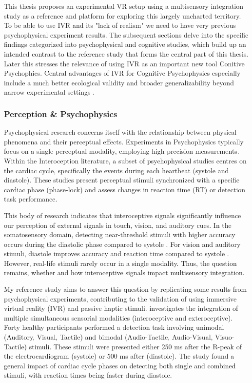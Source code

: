 \documentclass[12pt,oneside,openright]{report}
\begin{document}
This thesis proposes an experimental VR setup using a multisensory integration study as a reference and platform for exploring this largely uncharted territory. To be able to use IVR and its "lack of realism" we need to have very previous psychophysical experiment results. The subsequent sections delve into the specific findings categorized into psychophysical and cognitive studies, which build up an intended contrast to the reference study that forms the central part of this thesis. Later this stresses the relevance of using IVR as an important new tool Conitive Psychophics. Central advantages of IVR for Cognitive Psychophysics especially include a much better ecological validity and broader generalizability beyond narrow experimental settings \parencite{NASTASE2020117254}.

\subsubsection*{Perception \& Psychophysics}

Psychophysical research concerns itself with the relationship between physical phenomena and their perceptual effects. Experiments in Psychophysics typically focus on a single perceptual modality, employing high-precision measurements. Within the Interoception literature, a subset of psychophysical studies centres on the cardiac cycle, specifically the events during each heartbeat (systole and diastole). These studies present perceptual stimuli synchronized with a specific cardiac phase (phase-lock) and assess changes in reaction time (RT) or detection task performance.

This body of research indicates that interoceptive signals significantly influence our perception of external signals in touch, vision, and auditory cues. In the somatosensory domain, detecting near-threshold stimuli with higher accuracy occurs during the diastolic phase compared to systole \parencite{esra_p, AL2021118247, Grund643, motyka}. For vision and auditory stimuli, diastole improves accuracy and reaction time compared to systole \parencite{SALTAFOSSI2023108642}. However, real-life stimuli rarely occur in a single modality. Thus, the question remains, whether and how interoceptive signals impact multisensory integration.

My reference study aims to answer this question by replicating some results from psychophysical experiments, contributing to the validation of using immersive virtual reality (IVR) and passive haptic stimuli. \textcite{SALTAFOSSI2023108642} investigates the integration of multiple simultaneous sensorial modalities (interoceptive and exteroceptive). Forty healthy participants performed a detection task involving unimodal (Auditory, Visual, Tactile) and bimodal (Audio-Tactile, Audio-Visual, Visuo-Tactile) stimuli. These stimuli were presented either 250 ms after the R-peak of the electrocardiogram (systole) or 500 ms after (diastole). The study found a general impact of cardiac cycle phases on detecting both single and combined stimuli, with reaction times being faster during diastole.
\end{document}
